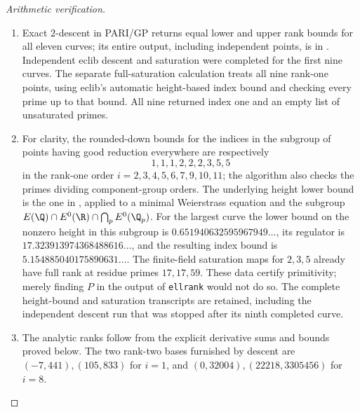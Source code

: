 \begin{proof}[Arithmetic verification]
\begin{enumerate}[label=\arabic*.,leftmargin=*]
\item Exact $2$-descent in PARI/GP returns equal lower and upper rank bounds
for all eleven curves; its entire output, including independent points,
is in . Independent eclib descent
and saturation were completed for the first nine curves. The separate
full-saturation calculation  treats
all nine rank-one points, using eclib's automatic height-based index
bound and checking every prime up to that bound. All nine returned
index one and an empty list of unsaturated primes.

\item For clarity, the rounded-down bounds for the indices in the subgroup
of points having good reduction everywhere are respectively
\[
 1,1,1,2,2,2,3,5,5
\]
in the rank-one order $i=2,3,4,5,6,7,9,10,11$; the algorithm also
checks the primes dividing component-group orders. The underlying
height lower bound is the one in
\citet[Theorem 1]{CrCremonaSiksek2006}, applied to a minimal
Weierstrass equation and the subgroup
$E(\Q)\cap E^0(\R)\cap\bigcap_pE^0(\Q_p)$.
For the largest curve the lower bound on the nonzero height in this
subgroup is $0.651940632595967949\ldots$, its regulator is
$17.323913974368488616\ldots$, and the resulting index bound is
$5.154885040175890631\ldots$. The finite-field saturation maps for
$2,3,5$ already have full rank at residue primes $17,17,59$.
These data certify primitivity; merely finding $P$ in the output of
\texttt{ellrank} would not do so. The complete height-bound and
saturation transcripts are retained, including the independent
descent run that was stopped after its ninth completed curve.

\item The analytic ranks follow from the explicit derivative sums and bounds
proved below. The two rank-two bases furnished by descent are
$(-7,441),(105,833)$ for $i=1$, and
$(0,32004),(22218,3305456)$ for $i=8$.
\end{enumerate}
\end{proof}

